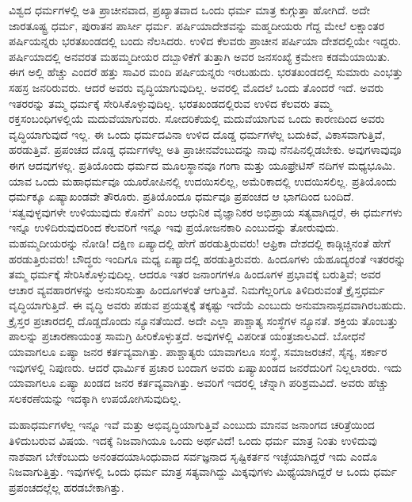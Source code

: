 \vskip 5pt

ವಿಶ್ವದ ಧರ್ಮಗಳಲ್ಲಿ ಅತಿ ಪ್ರಾಚೀನವಾದ, ಪ್ರಖ್ಯಾತವಾದ ಒಂದು ಧರ್ಮ ಮಾತ್ರ ಕುಗ್ಗುತ್ತಾ ಹೋಗಿದೆ. ಅದೇ ಜಾರತೂಷ್ಟ್ರ ಧರ್ಮ, ಪುರಾತನ ಪಾರ್ಸೀ ಧರ್ಮ. ಪರ್ಷಿಯಾದೇಶವನ್ನು ಮಹ್ಮದೀಯರು ಗೆದ್ದ ಮೇಲೆ ಲಕ್ಷಾಂತರ ಪರ್ಷಿಯನ್ನರು ಭರತಖಂಡದಲ್ಲಿ ಬಂದು ನೆಲಸಿದರು. ಉಳಿದ ಕೆಲವರು ಪ್ರಾಚೀನ ಪರ್ಷಿಯಾ ದೇಶದಲ್ಲಿಯೇ ಇದ್ದರು. ಪರ್ಷಿಯಾದಲ್ಲಿ ಅನವರತ ಮಹಮ್ಮದೀಯರ ದಬ್ಬಾಳಿಕೆಗೆ ತುತ್ತಾಗಿ ಅವರ ಜನಸಂಖ್ಯೆ ಕ್ರಮೇಣ ಕಡಮೆಯಾಯಿತು. ಈಗ ಅಲ್ಲಿ ಹೆಚ್ಚು ಎಂದರೆ ಹತ್ತು ಸಾವಿರ ಮಂದಿ ಪರ್ಷಿಯನ್ನರು ಇರಬಹುದು. ಭರತಖಂಡದಲ್ಲಿ ಸುಮಾರು ಎಂಭತ್ತು ಸಹಸ್ರ ಜನರಿರುವರು. ಆದರೆ ಅವರು ವೃದ್ಧಿಯಾಗುವುದಿಲ್ಲ. ಅವರಲ್ಲಿ ಮೊದಲೆ ಒಂದು ತೊಂದರೆ ಇದೆ. ಅವರು ಇತರರನ್ನು ತಮ್ಮ ಧರ್ಮಕ್ಕೆ ಸೇರಿಸಿಕೊಳ್ಳುವುದಿಲ್ಲ. ಭರತಖಂಡದಲ್ಲಿರುವ ಉಳಿದ ಕೆಲವರು ತಮ್ಮ ರಕ್ತಸಂಬಂಧಿಗಳಲ್ಲಿಯೆ ಮದುವೆಯಾಗುವರು. ಸೋದರಿಕೆಯಲ್ಲಿ ಮದುವೆಯಾಗುವ ಒಂದು ಕಾರಣದಿಂದ ಅವರು ವೃದ್ಧಿಯಾಗುವುದೆ ಇಲ್ಲ. ಈ ಒಂದು ಧರ್ಮದವಿನಾ ಉಳಿದ ದೊಡ್ಡ ಧರ್ಮಗಳೆಲ್ಲ ಬದುಕಿವೆ, ವಿಕಾಸವಾಗುತ್ತಿವೆ, ಹರಡುತ್ತಿವೆ. ಪ್ರಪಂಚದ ದೊಡ್ಡ ಧರ್ಮಗಳೆಲ್ಲ ಅತಿ ಪ್ರಾಚೀನವೆಂಬುದನ್ನು ನಾವು ನೆನಪಿನಲ್ಲಿಡಬೇಕು. ಅವುಗಳಾವುವೂ ಈಗ ಆದವುಗಳಲ್ಲ. ಪ್ರತಿಯೊಂದು ಧರ್ಮದ ಮೂಲಸ್ಥಾನವೂ ಗಂಗಾ ಮತ್ತು ಯೂಫ್ರೇಟಿಸ್​ ನದಿಗಳ ಮಧ್ಯಭೂಮಿ. ಯಾವ ಒಂದು ಮಹಾಧರ್ಮವೂ ಯೂರೋಪಿನಲ್ಲಿ ಉದಯಿಸಲಿಲ್ಲ, ಅಮೆರಿಕಾದಲ್ಲಿ ಉದಯಿಸಲಿಲ್ಲ. ಪ್ರತಿಯೊಂದು ಧರ್ಮಕ್ಕೂ ಏಷ್ಯಾಖಂಡವೇ ತೌರೂರು. ಪ್ರತಿಯೊಂದೂ ಧರ್ಮವೂ ಪ್ರಪಂಚದ ಆ ಭಾಗದಿಂದ ಬಂದಿದೆ. ‘ಸತ್ವವುಳ್ಳವುಗಳೇ ಉಳಿಯುವುದು ಕೊನೆಗೆ’ ಎಂಬ ಆಧುನಿಕ ವೈಜ್ಞಾನಿಕರ ಅಭಿಪ್ರಾಯ ಸತ್ಯವಾಗಿದ್ದರೆ, ಈ ಧರ್ಮಗಳು ಇನ್ನೂ ಉಳಿದಿರುವುದರಿಂದ ಕೆಲವರಿಗೆ ಇನ್ನೂ ಇವು ಪ್ರಯೋಜನಕಾರಿ ಎಂಬುದನ್ನು ತೋರುವುದು. ಮಹಮ್ಮದೀಯರನ್ನು ನೋಡಿ! ದಕ್ಷಿಣ ಏಷ್ಯಾದಲ್ಲಿ ಹೇಗೆ ಹರಡುತ್ತಿರುವರು! ಆಫ್ರಿಕಾ ದೇಶದಲ್ಲಿ ಕಾಡ್ಗಿಚ್ಚಿನಂತೆ ಹೇಗೆ ಹರಡುತ್ತಿರುವರು! ಬೌದ್ಧರು ಇಂದಿಗೂ ಮಧ್ಯ ಏಷ್ಯಾದಲ್ಲಿ ಹರಡುತ್ತಿರುವರು. ಹಿಂದೂಗಳು ಯೆಹೂದ್ಯರಂತೆ ಇತರರನ್ನು ತಮ್ಮ ಧರ್ಮಕ್ಕೆ ಸೇರಿಸಿಕೊಳ್ಳುವುದಿಲ್ಲ. ಆದರೂ ಇತರ ಜನಾಂಗಗಳೂ ಹಿಂದೂಗಳ ಪ್ರಭಾವಕ್ಕೆ ಬರುತ್ತಿವೆ; ಅವರ ಆಚಾರ ವ್ಯವಹಾರಗಳನ್ನು ಅನುಸರಿಸುತ್ತಾ ಹಿಂದೂಗಳಂತೆ ಆಗುತ್ತಿವೆ. ನಿಮಗೆಲ್ಲರಿಗೂ ತಿಳಿದಿರುವಂತೆ ಕ್ರೈಸ್ತಧರ್ಮ ವೃದ್ಧಿಯಾಗುತ್ತಿದೆ. ಈ ವೃದ್ಧಿ ಅವರು ಪಡುವ ಪ್ರಯತ್ನಕ್ಕೆ ತಕ್ಕಷ್ಟು ಇದೆಯೆ ಎಂಬುದು ಅನುಮಾನಾಸ್ಪದವಾಗಿರಬಹುದು. ಕ್ರೈಸ್ತರ ಪ್ರಚಾರದಲ್ಲಿ ದೊಡ್ಡದೊಂದು ನ್ಯೂನತೆಯಿದೆ. ಅದೇ ಎಲ್ಲಾ ಪಾಶ್ಚಾತ್ಯ ಸಂಸ್ಥೆಗಳ ನ್ಯೂನತೆ. ಶಕ್ತಿಯ ತೊಂಬತ್ತು ಪಾಲನ್ನು ಪ್ರಚಾರಣಾಯಂತ್ರ ಸಾಮಗ್ರಿ ಹೀರಿಕೊಳ್ಳುತ್ತದೆ. ಅವುಗಳಲ್ಲಿ ವಿಪರೀತ ಯಂತ್ರಜಾಲವಿದೆ. ಬೋಧನೆ ಯಾವಾಗಲೂ ಏಷ್ಯಾ ಜನರ ಕರ್ತವ್ಯವಾಗಿತ್ತು. ಪಾಶ್ಚಾತ್ಯರು ಯಾವಾಗಲೂ ಸಂಸ್ಥೆ, ಸಮಾಜರಚನೆ, ಸೈನ್ಯ, ಸರ್ಕಾರ ಇವುಗಳಲ್ಲಿ ನಿಪುಣರು. ಆದರೆ ಧಾರ್ಮಿಕ ಪ್ರಚಾರ ಬಂದಾಗ ಅವರು ಏಷ್ಯಾಖಂಡದ ಜನರೆದುರಿಗೆ ನಿಲ್ಲಲಾರರು. ಇದು ಯಾವಾಗಲೂ ಏಷ್ಯಾ ಖಂಡದ ಜನರ ಕರ್ತವ್ಯವಾಗಿತ್ತು. ಅವರಿಗೆ ಇದರಲ್ಲಿ ಚೆನ್ನಾಗಿ ಪರಿಶ್ರಮವಿದೆ. ಅವರು ಹೆಚ್ಚು ಸಲಕರಣೆಯನ್ನು ಇದಕ್ಕಾಗಿ ಉಪಯೋಗಿಸುವುದಿಲ್ಲ.

\newpage

ಮಹಾಧರ್ಮಗಳೆಲ್ಲ ಇನ್ನೂ ಇವೆ ಮತ್ತು ಅಭಿವೃದ್ಧಿಯಾಗುತ್ತಿವೆ ಎಂಬುದು ಮಾನವ ಜನಾಂಗದ ಚರಿತ್ರೆಯಿಂದ ತಿಳಿದುಬರುವ ವಿಷಯ. ಇದಕ್ಕೆ ನಿಜವಾಗಿಯೂ ಒಂದು ಅರ್ಥವಿದೆ! ಒಂದು ಧರ್ಮ ಮಾತ್ರ ನಿಂತು ಉಳಿದುವು ನಾಶವಾಗ ಬೇಕೆಂಬುದು ಅನಂತದಯಾಸಿಂಧುವಾದ ಸರ್ವಜ್ಞನಾದ ಸೃಷ್ಟಿಕರ್ತನ ಇಚ್ಛೆಯಾಗಿದ್ದರೆ ಇದು ಎಂದೊ ನಿಜವಾಗುತ್ತಿತ್ತು. ಇವುಗಳಲ್ಲಿ ಒಂದು ಧರ್ಮ ಮಾತ್ರ ಸತ್ಯವಾಗಿದ್ದು ಮಿಕ್ಕವುಗಳು ಮಿಥ್ಯೆಯಾಗಿದ್ದರೆ ಆ ಒಂದು ಧರ್ಮ ಪ್ರಪಂಚದಲ್ಲೆಲ್ಲ ಹರಡಬೇಕಾಗಿತ್ತು.

